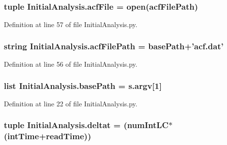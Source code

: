 \hypertarget{namespace_initial_analysis_a90ac90deb3293de6009ff8774a0fa67e}{
\subsubsection[{acf\-File}]{\setlength{\rightskip}{0pt plus 5cm}tuple Initial\-Analysis.\-acf\-File = open({\bf acf\-File\-Path})}}\label{namespace_initial_analysis_a90ac90deb3293de6009ff8774a0fa67e}


Definition at line 57 of file Initial\-Analysis.\-py.

\hypertarget{namespace_initial_analysis_a4ddd93459df9f2f6eafa747227f54916}{
\subsubsection[{acf\-File\-Path}]{\setlength{\rightskip}{0pt plus 5cm}string Initial\-Analysis.\-acf\-File\-Path = {\bf base\-Path}+'acf.\-dat'}}\label{namespace_initial_analysis_a4ddd93459df9f2f6eafa747227f54916}


Definition at line 56 of file Initial\-Analysis.\-py.

\hypertarget{namespace_initial_analysis_a462d97ae58744d7f39a0a11f5a4f7642}{
\subsubsection[{base\-Path}]{\setlength{\rightskip}{0pt plus 5cm}list Initial\-Analysis.\-base\-Path = s.\-argv\mbox{[}1\mbox{]}}}\label{namespace_initial_analysis_a462d97ae58744d7f39a0a11f5a4f7642}


Definition at line 22 of file Initial\-Analysis.\-py.

\hypertarget{namespace_initial_analysis_a8c65b78c4fc5b3f333cebee5997e6fce}{
\subsubsection[{deltat}]{\setlength{\rightskip}{0pt plus 5cm}tuple Initial\-Analysis.\-deltat = ({\bf num\-Int\-L\-C}$\ast$({\bf int\-Time}+{\bf read\-Time}))}}\label{namespace_initial_analysis_a8c65b78c4fc5b3f333cebee5997e6fce}


